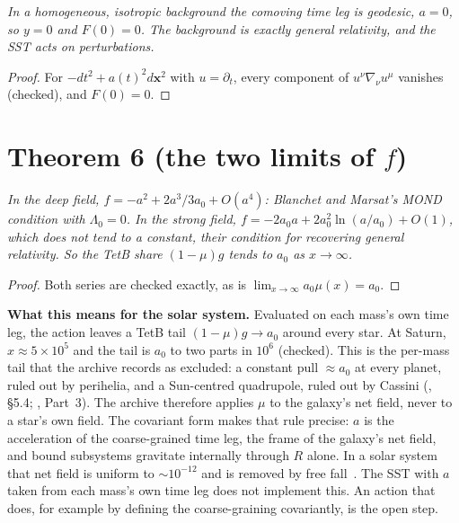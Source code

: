 \documentclass[twocolumn]{iopjournal}
\begin{document}
\emph{In a homogeneous, isotropic background the comoving time leg is
geodesic, $a = 0$, so $y = 0$ and $F(0) = 0$. The background is
exactly general relativity, and the SST acts on perturbations.}

\begin{proof}
For $-dt^2 + a(t)^2d\mathbf x^2$ with $u = \partial_t$, every
component of $u^\nu\nabla_\nu u^\mu$ vanishes (checked), and
$F(0) = 0$.
\end{proof}


\section*{Theorem 6 (the two limits of $f$)}

\emph{In the deep field, $f = -a^2 + 2a^3/3a_0 + O(a^4)$:
Blanchet and Marsat's MOND condition with $\Lambda_0 = 0$. In the
strong field, $f = -2a_0a + 2a_0^2\ln(a/a_0) + O(1)$, which does not
tend to a constant, their condition for recovering general
relativity. So the TetB share $(1-\mu)g$ tends to $a_0$ as
$x\to\infty$.}

\begin{proof}
Both series are checked exactly, as is
$\lim_{x\to\infty} a_0\mu(x) = a_0$.
\end{proof}

\textbf{What this means for the solar system.} Evaluated on each
mass's own time leg, the action leaves a TetB tail
$(1-\mu)g \to a_0$ around every star. At Saturn, $x\approx 5\times10^5$
and the tail is $a_0$ to two parts in $10^6$ (checked). This is the
per-mass tail that the archive records as excluded: a constant pull
$\approx a_0$ at every planet, ruled out by perihelia, and a
Sun-centred quadrupole, ruled out by Cassini (\cite{NelsonColes},
\S5.4; \cite{NelsonBimetric}, Part~3). The archive therefore applies
$\mu$ to the galaxy's net field, never to a star's own field. The
covariant form makes that rule precise: $a$ is the acceleration of
the coarse-grained time leg, the frame of the galaxy's net field, and
bound subsystems gravitate internally through $R$ alone. In a solar
system that net field is uniform to $\sim10^{-12}$ and is removed by
free fall~\cite{NelsonColes}. The SST with $a$ taken
from each mass's own time leg does not implement this. An action that
does, for example by defining the coarse-graining covariantly, is the
open step.

\end{document}

